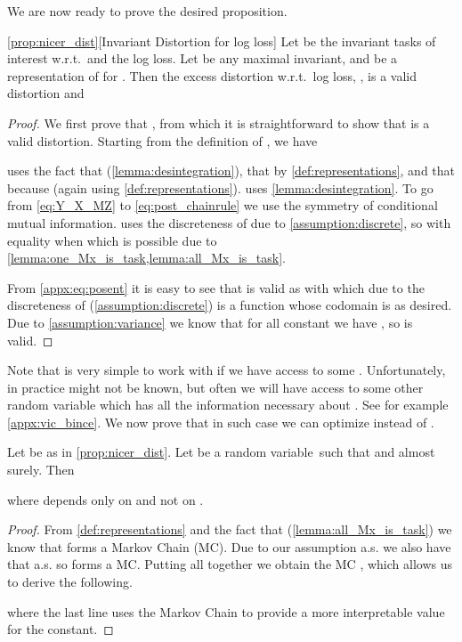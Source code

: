 \documentclass[final]{article}
\begin{document}
We are now ready to prove the desired proposition.



\begin{manualprop}{\ref{prop:nicer_dist}}[Invariant Distortion for log loss]\label{appx:prop:invariant_distortion}
Let  be the invariant tasks of interest w.r.t.\   and the log loss. Let  be any maximal invariant, and  be a representation of  for .
Then the excess distortion w.r.t.\ log loss, \disttextinv{}, is a valid distortion and

\end{manualprop}
\begin{proof}
We first prove that , from which it is straightforward to show that \disttextinv{} is a valid distortion. Starting from the definition of \disttextinv{}, we have


 uses the fact that  (\cref{lemma:desintegration}), that  by \cref{def:representations}, and that   because  (again using \cref{def:representations}).
 uses \cref{lemma:desintegration}.
To go from \cref{eq:Y_X_MZ} to \cref{eq:post_chainrule} we use the symmetry of conditional mutual information.
 uses the discreteness of  due to \cref{assumption:discrete}, so  with equality when  which is possible due to \cref{lemma:one_Mx_is_task,lemma:all_Mx_is_task}.

From \cref{appx:eq:posent} it is easy to see that \disttextinv{} is valid as  with  which due to the discreteness of  (\cref{assumption:discrete}) is a function whose codomain is  as desired.
Due to \cref{assumption:variance} we know that for all constant  we have , so \disttextinv{} is valid.
\end{proof}

Note that  is very simple to work with if we have access to some .
Unfortunately, in practice  might not be known, but often we will have access to some other random variable  which has all the information necessary about .
See for example \cref{appx:vic_bince}.
We now prove that in such case we can optimize  instead of .

\begin{proposition}\label{prop:dist_no_Mx}
Let  be as in \cref{prop:nicer_dist}.
Let  be a random variable\ such that  and  almost surely. Then

where  depends only on  and not on .
\end{proposition}
\begin{proof}
From \cref{def:representations} and the fact that  (\cref{lemma:all_Mx_is_task}) we know that  forms a Markov Chain (MC). 
Due to our assumption 
 a.s. we also have that  a.s. so   forms a MC.
Putting all together we obtain the MC , which allows us to derive the following.

where the last line uses the Markov Chain  to provide a more interpretable value for the constant.
\end{proof}
\end{document}
